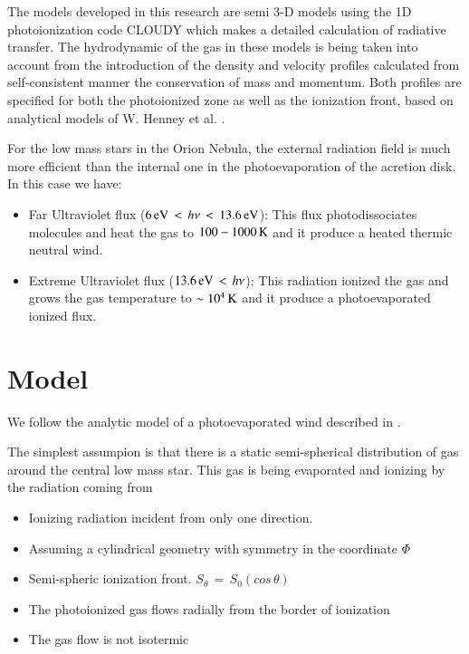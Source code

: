 \documentclass[useAMS,usenatbib]{mn2e}
\begin{document}
The models developed in this research are semi 3-D models using the 1D photoionization code {\sc CLOUDY} \citep{1998PASP..110..761F} which makes a detailed calculation of radiative transfer. The hydrodynamic of the gas in these models is being taken into account from the introduction of the density and velocity profiles calculated from self-consistent manner the conservation of mass and momentum. Both profiles are specified for both the photoionized zone as well as the ionization front, based on analytical models of W. Henney et al. \citep{1999AJ....118.2350H,2005ApJ...621..328H}.

For the low mass stars in the Orion Nebula, the external radiation field \tc is much more efficient than the internal one in the photoevaporation of the acretion disk. In this case we have:

\begin{itemize}
\item{Far Ultraviolet flux ($6 \, {\rm eV} \, < \, h \nu \, < \, 13.6 \, {\rm eV}$): This flux photodissociates molecules and heat the gas to $100 - 1000 \, {\rm K}$ and it produce a heated thermic neutral wind.} 
\item{Extreme Ultraviolet flux ($13.6 \, {\rm eV} \, < \, h \nu$): This radiation ionized the gas and grows the gas temperature to $\sim 10^4 \, {\rm K}$ and it produce a photoevaporated ionized flux.}
\end{itemize}

\section{Model}
\label{sec:model}

We follow the analytic model of a photoevaporated wind described in \citet{1998AJ....116..322H}.
 
The simplest assumpion is that there is a static semi-spherical distribution of gas around the central low mass star. This gas is being evaporated and ionizing by the radiation coming from \tc

\begin{itemize}
\item{Ionizing radiation incident from only one direction.}
\item{Assuming a cylindrical geometry with symmetry in the coordinate $\Phi$}
\item{Semi-spheric ionization front. $S_{\theta} \, = \, S_0 (cos \, \theta)$}
\item{The photoionized gas flows radially from the border of ionization}
\item{The gas flow is not isotermic}
\end{itemize}
\end{document}
